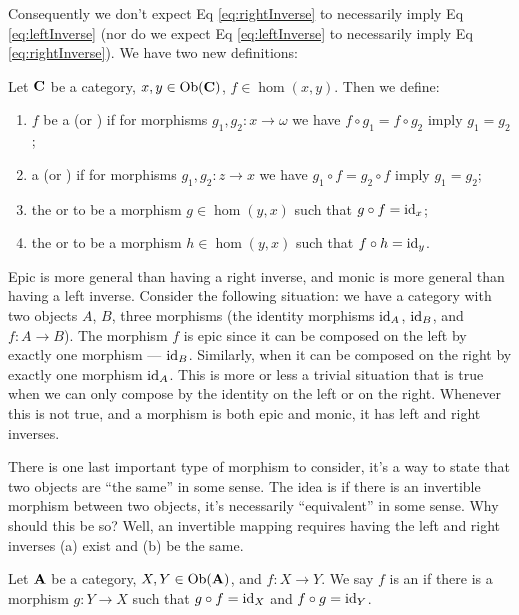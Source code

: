 Consequently we don't expect Eq \eqref{eq:rightInverse} to necessarily imply
Eq \eqref{eq:leftInverse} (nor do we expect Eq
\eqref{eq:leftInverse} to necessarily imply Eq \eqref{eq:rightInverse}). We
have two new definitions:
\begin{defn}%
Let $\mathbf{C}$ be a category, $x,y\in\operatorname{Ob}(\mathbf{C})$,
$f\in\hom(x,y)$. Then we define:
\begin{enumerate}
\item $f$ be a  (or ) if for
  morphisms $g_{1},g_{2}:x\to \omega$ we have $f\circ g_1=f\circ
  g_2$ imply $g_1=g_2$;
\item a  (or ) if for morphisms
  $g_{1},g_{2}:z\to x$ we have $g_1\circ f=g_2\circ f$ imply $g_1=g_2$;
\item the  or  to be a morphism
  $g\in\hom(y,x)$ such that $g\circ f=\operatorname{id}_{x}$; 
\item the  or  to be a morphism
  $h\in\hom(y,x)$ such that $f\circ h=\operatorname{id}_{y}$.
\end{enumerate}
\end{defn}
\begin{rmk}
Epic is more general than having a right inverse, and monic is
more general than having a left inverse. Consider the following
situation: we have a category with two objects $A$, $B$, three
morphisms (the identity morphisms $\operatorname{id}_{A}$, $\operatorname{id}_{B}$, and $f:A\to
B$). The morphism $f$ is epic since it can be composed on the
left by exactly one morphism --- $\operatorname{id}_{B}$. Similarly, when it can
be composed on the right by exactly one morphism $\operatorname{id}_{A}$. This
is more or less a trivial situation that is true when we can only
compose by the identity on the left or on the right. Whenever
this is not true, and a morphism is both epic and monic, it has
left and right inverses.
\end{rmk}

There is one last important type of morphism to consider, it's a
way to state that two objects are ``the same'' in some sense. The
idea is if there is an invertible morphism between two objects,
it's necessarily ``equivalent'' in some sense. Why should this be
so? Well, an invertible mapping requires having the left and
right inverses (a) exist and (b) be the same. 

\begin{defn}%
Let $\mathbf{A}$ be a category, $X,Y\in\operatorname{Ob}(\mathbf{A})$, and $f:X\to
Y$. We say $f$ is an  if there is a morphism
$g:Y\to X$ such that $g\circ f=\operatorname{id}_{X}$ and $f\circ g=\operatorname{id}_{Y}$.
\end{defn}

